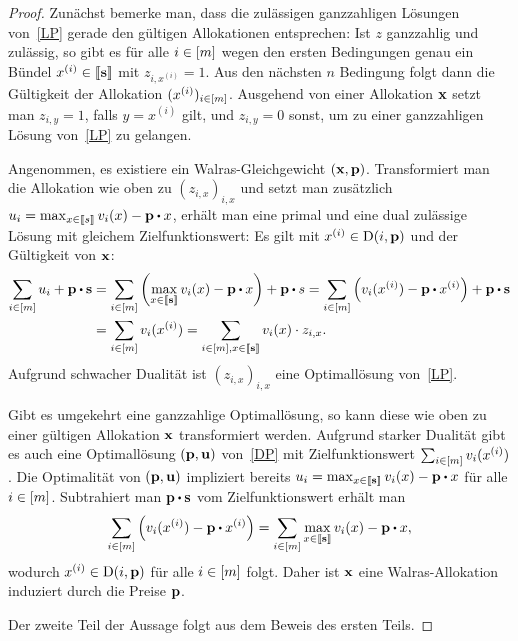 \begin{proof}
	Zunächst bemerke man, dass die zulässigen ganzzahligen Lösungen von~\eqref{LP} gerade den gültigen Allokationen entsprechen:
	Ist $z$ ganzzahlig und zulässig, so gibt es für alle $i\in\left[ m \right]$ wegen den ersten Bedingungen genau ein Bündel $x^{(i)}\in\left\llbracket \mathbf{s} \right\rrbracket$ mit $z_{i,x^{(i)}} = 1$.
	Aus den nächsten $n$ Bedingung folgt dann die Gültigkeit der Allokation $(x^{(i)})_{i\in\left[ m \right]}$.
	Ausgehend von einer Allokation $\mathbf{x}$ setzt man $z_{i,y} = 1$, falls $y = x^{(i)}$ gilt, und $z_{i,y}=0$ sonst, um zu einer ganzzahligen Lösung von~\eqref{LP} zu gelangen.
	
	Angenommen, es existiere ein Walras-Gleichgewicht $(\mathbf{x}, \mathbf{p})$.
	Transformiert man die Allokation wie oben zu $(z_{i,x})_{i,x}$ und setzt man zusätzlich $u_i = \max_{x\in\ffirst{s}} v_i(x) - \fp \bcdot x$, erhält man eine primal und eine dual zulässige Lösung mit gleichem Zielfunktionswert:
	Es gilt mit $x^{(i)}\in\operatorname{D}(i, \mathbf{p})$ und der Gültigkeit von $\mathbf{x}$:
	\begin{align*}
		\sum_{i\in\first{m}} u_i + \fp \bcdot \fs
		&= \sum_{i\in\first{m}} \left( \max_{x\in\ffirst{\fs}} v_i(x) - \fp \bcdot x \right) + \fp \bcdot s = \sum_{i\in\first{m}} \left( v_i(x^{(i)}) - \fp\bcdot x^{(i)} \right) + \fp \bcdot \fs \\
		&= \sum_{i\in\first{m}} v_i(x^{(i)}) = \sum_{i\in\first{m}, x\in\ffirst{\fs}} v_i(x) \cdot z_{i,x}.
	\end{align*}
	Aufgrund schwacher Dualität ist $(z_{i,x})_{i,x}$ eine Optimallösung von~\eqref{LP}.
	
	Gibt es umgekehrt eine ganzzahlige Optimallösung, so kann diese wie oben zu einer gültigen Allokation $\mathbf{x}$ transformiert werden.
	Aufgrund starker Dualität gibt es auch eine Optimallösung $(\mathbf{p}, \mathbf{u})$ von~\eqref{DP} mit Zielfunktionswert $\sum_{i\in\left[ m \right]} v_i(x^{(i)})$.
	Die Optimalität von $(\mathbf{p}, \mathbf{u})$ impliziert bereits $u_i = \max_{x\in\ffirst{\fs}} v_i(x) - \fp \bcdot x$ für alle $i\in\left[ m \right]$.
	Subtrahiert man $\fp \bcdot \fs$ vom Zielfunktionswert erhält man 
	\[
	\sum_{i\in\first{m}} \left( v_i(x^{(i)}) - \fp \bcdot x^{(i)} \right) = \sum_{i\in\first{m}} \max_{x\in\ffirst{\fs}} v_i(x) - \fp \bcdot x,
	\]
	wodurch $x^{(i)}\in\operatorname{D}(i, \mathbf{p})$ für alle $i\in\left[ m \right]$ folgt.
	Daher ist $\mathbf{x}$ eine Walras-Allokation induziert durch die Preise $\mathbf{p}$.
	
	Der zweite Teil der Aussage folgt aus dem Beweis des ersten Teils.
\end{proof}

